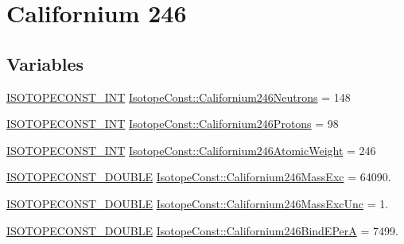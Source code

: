 \hypertarget{group___isotope_const-_californium-_cf246}{}\section{Californium 246}
\label{group___isotope_const-_californium-_cf246}
\subsection*{Variables}
\begin{DoxyCompactItemize}
\item 
\mbox{\hyperlink{group___isotope_const-_macros_ga5f18360b3e99483a35c32d789e62621c}{I\+S\+O\+T\+O\+P\+E\+C\+O\+N\+S\+T\+\_\+\+I\+NT}} \mbox{\hyperlink{group___isotope_const-_californium-_cf246_gadf7dca0e4133d5f64779f8906721d46d}{Isotope\+Const\+::\+Californium246\+Neutrons}} = 148
\item 
\mbox{\hyperlink{group___isotope_const-_macros_ga5f18360b3e99483a35c32d789e62621c}{I\+S\+O\+T\+O\+P\+E\+C\+O\+N\+S\+T\+\_\+\+I\+NT}} \mbox{\hyperlink{group___isotope_const-_californium-_cf246_ga988bdfb666f3835094c8015a3853ed23}{Isotope\+Const\+::\+Californium246\+Protons}} = 98
\item 
\mbox{\hyperlink{group___isotope_const-_macros_ga5f18360b3e99483a35c32d789e62621c}{I\+S\+O\+T\+O\+P\+E\+C\+O\+N\+S\+T\+\_\+\+I\+NT}} \mbox{\hyperlink{group___isotope_const-_californium-_cf246_gaf2091cb5d1269eff67b3a907dac8f4f2}{Isotope\+Const\+::\+Californium246\+Atomic\+Weight}} = 246
\item 
\mbox{\hyperlink{group___isotope_const-_macros_ga8f45a7272ce02c0b4c65c44636ed719a}{I\+S\+O\+T\+O\+P\+E\+C\+O\+N\+S\+T\+\_\+\+D\+O\+U\+B\+LE}} \mbox{\hyperlink{group___isotope_const-_californium-_cf246_gaa2b5bdee09f2ef1ed0b7ef9037cd509c}{Isotope\+Const\+::\+Californium246\+Mass\+Exc}} = 64090.
\item 
\mbox{\hyperlink{group___isotope_const-_macros_ga8f45a7272ce02c0b4c65c44636ed719a}{I\+S\+O\+T\+O\+P\+E\+C\+O\+N\+S\+T\+\_\+\+D\+O\+U\+B\+LE}} \mbox{\hyperlink{group___isotope_const-_californium-_cf246_ga9ea894ce7c7005ca7ac11b53ee07dc5d}{Isotope\+Const\+::\+Californium246\+Mass\+Exc\+Unc}} = 1.
\item 
\mbox{\hyperlink{group___isotope_const-_macros_ga8f45a7272ce02c0b4c65c44636ed719a}{I\+S\+O\+T\+O\+P\+E\+C\+O\+N\+S\+T\+\_\+\+D\+O\+U\+B\+LE}} \mbox{\hyperlink{group___isotope_const-_californium-_cf246_ga8406709329ca1bda093995401233c6fd}{Isotope\+Const\+::\+Californium246\+Bind\+E\+PerA}} = 7499.

\end{DoxyCompactItemize}
